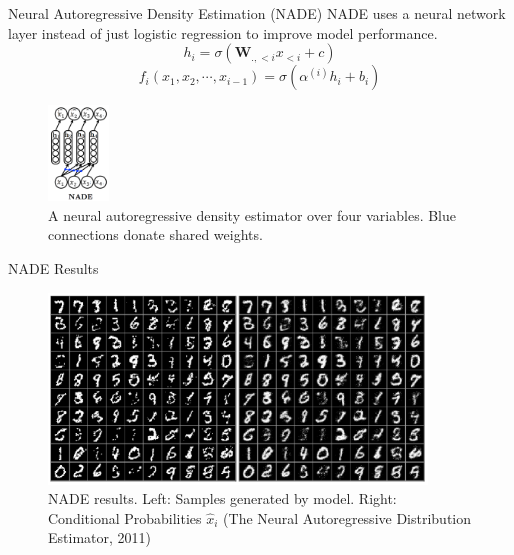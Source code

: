 \begin{frame}[allowframebreaks]{Neural Autoregressive Density Estimation (NADE)}
NADE uses a neural network layer instead of just logistic regression to improve model performance.
    $$h_i = \sigma(\mathbf{W}_{.,<i} x_{<i} + c)$$
    $$f_i(x_1,x_2,\cdots,x_{i-1}) = \sigma(\alpha^{(i)}h_i+b_i)$$

\begin{figure}
    \centering
    \includegraphics[height=1.0in]{images/arm/nade.png}
    \caption{A neural autoregressive density estimator over four variables. Blue connections donate shared weights.}
\end{figure}

\end{frame}

\begin{frame}{NADE Results}

\begin{figure}
    \centering
    \includegraphics[height=2.0in]{images/arm/nade_results.png}
    \caption{NADE results. Left: Samples generated by model. Right: Conditional Probabilities $\hat{x}_i$ (The Neural Autoregressive Distribution Estimator, 2011)}
\end{figure}

\end{frame}